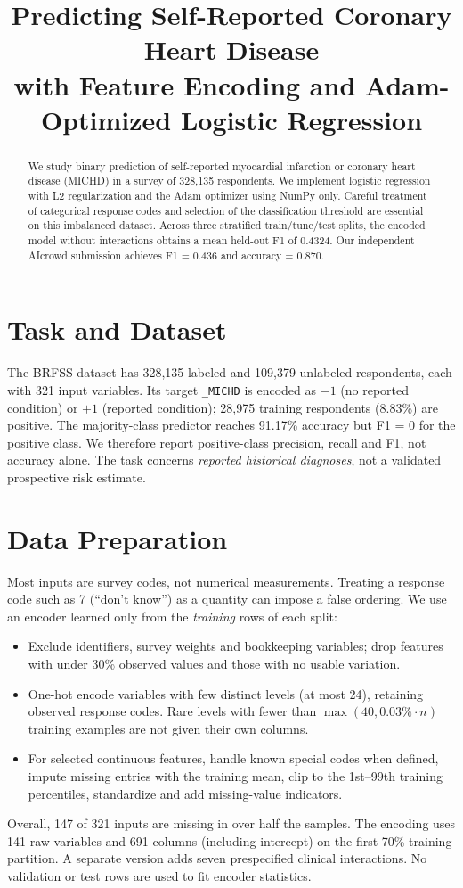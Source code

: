 \documentclass[10pt,conference]{IEEEtran}
\title{Predicting Self-Reported Coronary Heart Disease\\with Feature Encoding and Adam-Optimized Logistic Regression}
\author{\IEEEauthorblockN{Ziyad Boudalal}
\IEEEauthorblockA{CS-433 Machine Learning --- EPFL, Fall 2026}}
\begin{document}
\maketitle
\begin{abstract}
We study binary prediction of self-reported myocardial infarction or coronary heart disease (MICHD) in a survey of 328,135 respondents. We implement logistic regression with L2 regularization and the Adam optimizer using NumPy only. Careful treatment of categorical response codes and selection of the classification threshold are essential on this imbalanced dataset. Across three stratified train/tune/test splits, the encoded model without interactions obtains a mean held-out F1 of 0.4324. Our independent AIcrowd submission achieves F1 = 0.436 and accuracy = 0.870.
\end{abstract}

\section{Task and Dataset}
The BRFSS dataset has 328,135 labeled and 109,379 unlabeled respondents, each with 321 input variables. Its target \texttt{\_MICHD} is encoded as $-1$ (no reported condition) or $+1$ (reported condition); 28,975 training respondents (8.83\%) are positive. The majority-class predictor reaches 91.17\% accuracy but F1 = 0 for the positive class. We therefore report positive-class precision, recall and F1, not accuracy alone. The task concerns \emph{reported historical diagnoses}, not a validated prospective risk estimate.

\section{Data Preparation}
Most inputs are survey codes, not numerical measurements. Treating a response code such as 7 (``don't know'') as a quantity can impose a false ordering. We use an encoder learned only from the \emph{training} rows of each split:
\begin{itemize}
\setlength{\itemsep}{0pt}
\item Exclude identifiers, survey weights and bookkeeping variables; drop features with under 30\% observed values and those with no usable variation.
\item One-hot encode variables with few distinct levels (at most 24), retaining observed response codes. Rare levels with fewer than $\max(40,0.03\%\cdot n)$ training examples are not given their own columns.
\item For selected continuous features, handle known special codes when defined, impute missing entries with the training mean, clip to the 1st--99th training percentiles, standardize and add missing-value indicators.
\end{itemize}
Overall, 147 of 321 inputs are missing in over half the samples. The encoding uses 141 raw variables and 691 columns (including intercept) on the first 70\% training partition. A separate version adds seven prespecified clinical interactions. No validation or test rows are used to fit encoder statistics.
\end{document}
